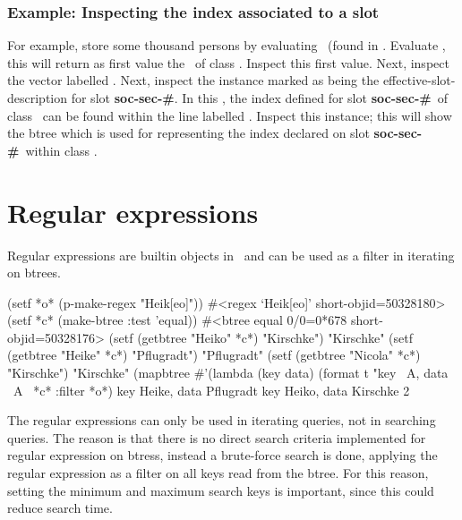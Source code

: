 \subsubsection[Inspecting the index associated to a slot]{Example:
  Inspecting the index associated to a slot} 

For example, store some thousand persons by evaluating
\ (found in
.
Evaluate , this will return as first
value the \clsdo\ of class . Inspect this first value.
Next, inspect the vector labelled .
Next, inspect the instance marked as being the
effective-slot-description for slot \textbf{soc-sec-\#}. In this \sltdo,
the index defined for slot \textbf{soc-sec-\#}\ of class \ 
can be found within the line labelled . Inspect
this instance; this will show the btree which is used for representing
the index declared on slot \textbf{soc-sec-\#}\ within class
.

\section{Regular expressions}%
\label{sec:RegEx}

Regular expressions are builtin objects in \plob\ and can be used as a
filter in iterating on btrees.

\begin{CompactCode}
\listener{}(setf *o* (p-make-regex "Heik[eo]"))
#<regex `Heik[eo]' short-objid=50328180>
\listener{}(setf *c* (make-btree :test 'equal))
#<btree equal 0/0=0*678 short-objid=50328176>
\listener{}(setf (getbtree "Heiko" *c*) "Kirschke")
"Kirschke"
\listener{}(setf (getbtree "Heike" *c*) "Pflugradt")
"Pflugradt"
\listener{}(setf (getbtree "Nicola" *c*) "Kirschke")
"Kirschke"
\listener{}(mapbtree #'(lambda (key data)
                          (format t "key ~A, data ~A~%
                     *c* :filter *o*)
key Heike, data Pflugradt
key Heiko, data Kirschke
2
\end{CompactCode}

The regular expressions can only be used in iterating queries, not in
searching queries.  The reason is that there is no direct search
criteria implemented for regular expression on btress, instead a
brute-force search is done, applying the regular expression as a
filter on all keys read from the btree. For this reason, setting the
minimum and maximum search keys is important, since this could reduce
search time.

